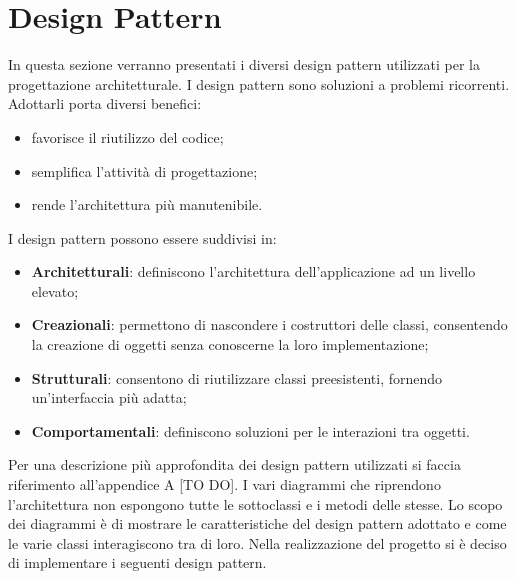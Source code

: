 %



\section{Design Pattern} %
\label{sec:design_pattern}
In questa sezione verranno presentati i diversi design pattern utilizzati per la progettazione architetturale. I design pattern sono soluzioni a problemi ricorrenti. Adottarli porta diversi benefici:
	\begin{itemize}
		\item favorisce il riutilizzo del codice;
		\item semplifica l’attività di progettazione;
		\item rende l’architettura più manutenibile.
	\end{itemize}
	\noindent
I design pattern possono essere suddivisi in:
	\begin{itemize}
		\item \textbf{Architetturali}: definiscono l’architettura dell’applicazione ad un livello elevato;
		\item \textbf{Creazionali}: permettono di nascondere i costruttori delle classi, consentendo la creazione di oggetti senza conoscerne la loro implementazione;
		\item \textbf{Strutturali}: consentono di riutilizzare classi preesistenti, fornendo un’interfaccia più adatta;
		\item \textbf{Comportamentali}: definiscono soluzioni per le interazioni tra oggetti.
	\end{itemize}
	\noindent
	\newline
Per una descrizione più approfondita dei design pattern utilizzati si faccia riferimento all’appendice A [TO DO]. I vari diagrammi che riprendono l’architettura non espongono tutte le sottoclassi e i metodi delle stesse. Lo scopo dei diagrammi è di mostrare le caratteristiche del design pattern adottato e come le varie classi interagiscono tra di loro. Nella realizzazione del progetto \projectName{} si è deciso di implementare i seguenti design pattern.

	\pagebreak

	 \clearpage \newpage
	 \clearpage \newpage
	 \clearpage \newpage
	 \clearpage \newpage
